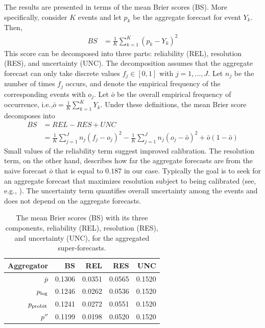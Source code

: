 \documentclass[11pt]{article}
\theoremstyle{definition}
\theoremstyle{definition}
\def\probit{p_{\rm probit}}
\def\plog{p_{\rm log}}
\begin{document}
 
The results are presented in terms of the mean Brier scores (BS). More specifically, consider $K$
events and let $p_k$ be the aggregate forecast for event $Y_k$. Then,
 \begin{align*}
BS &= \frac{1}{K} \sum_{k=1}^K (p_k - Y_k)^2
 \end{align*}
 This score can be decomposed into three parts: reliability (REL),
resolution (RES), and uncertainty (UNC). The decomposition assumes
that the aggregate forecast can only take discrete values $f_j \in
[0,1]$ with $j = 1, \dots, J$. Let $n_j$ be the number of times $f_j$
occurs, and denote the empirical frequency of the corresponding events
with $o_j$.  Let $\bar{o}$ be the overall empirical frequency of
occurrence, i.e.,$\bar{o} = \frac{1}{K} \sum_{k=1}^K Y_k$. Under these definitions, the
mean Brier score decomposes into
 \begin{align*}
BS &= REL - RES + UNC\\
&= \frac{1}{K} \sum_{j=1}^J n_j (f_j - o_j)^2 - \frac{1}{K} \sum_{j=1}^J n_j (o_j - \bar{o})^2 + \bar{o}(1-\bar{o})
 \end{align*}
 Small values of the reliability term suggest improved
calibration. The resolution term, on the other hand, describes how far
the aggregate forecasts are from the naive forecast $\bar{o}$ that is equal to $0.187$ in our case. Typically the goal is
to seek for an aggregate forecast that maximizes resolution subject to
being calibrated (see, e.g., \citealt{gneiting2007probabilistic}). The
uncertainty term quantifies overall uncertainty among the events and
does not depend on the aggregate forecasts.
 
\begin{table}[t]
\centering
\begin{tabular}{rrrrr}
  \hline
Aggregator & BS & REL & RES & UNC \\ 
  \hline
$\bar{p}$ & 0.1306 & 0.0351 & 0.0565 & 0.1520 \\ 
 $\plog$ & 0.1246 & 0.0262 & 0.0536 & 0.1520 \\ 
 $\probit$ & 0.1241 & 0.0272 & 0.0551 & 0.1520 \\ 
 $p''$ & 0.1199 & 0.0198 & 0.0520 & 0.1520 \\ 
   \hline
\end{tabular}
\caption{The mean Brier scores (BS) with its three components, reliability (REL), resolution (RES), and uncertainty (UNC), for the aggregated super-forecasts.}
\label{BrierTable}
\end{table}
\end{document}
